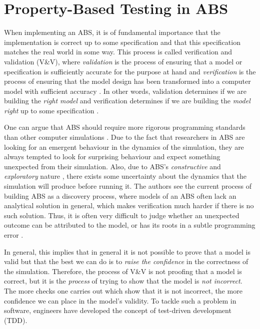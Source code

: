 \chapter{Property-Based Testing in ABS}
\label{ch:property}

When implementing an ABS, it is of fundamental importance that the implementation is correct up to some specification and that this specification matches the real world in some way. This process is called verification and validation (V\&V), where \textit{validation} is the process of ensuring that a model or specification is sufficiently accurate for the purpose at hand and \textit{verification} is the process of ensuring that the model design has been transformed into a computer model with sufficient accuracy \cite{robinson_simulation:_2014}. In other words, validation determines if we are building the \textit{right model} and verification determines if we are building the \textit{model right} up to some specification \cite{balci_verification_1998}.

One can argue that ABS should require more rigorous programming standards than other computer simulations \cite{polhill_ghost_2005}. Due to the fact that researchers in ABS are looking for an emergent behaviour in the dynamics of the simulation, they are always tempted to look for surprising behaviour and expect something unexpected from their simulation. 
Also, due to ABS's \textit{constructive} and \textit{exploratory} nature \cite{epstein_chapter_2006, epstein_generative_2012}, there exists some uncertainty about the dynamics that the simulation will produce before running it. The authors \cite{ormerod_validation_2006} see the current process of building ABS as a discovery process, where models of an ABS often lack an analytical solution in general, which makes verification much harder if there is no such solution. Thus, it is often very difficult to judge whether an unexpected outcome can be attributed to the model, or has its roots in a subtle programming error \cite{galan_errors_2009}.

In general, this implies that in general it is not possible to prove that a model is valid but that the best we can do is to \textit{raise the confidence} in the correctness of the simulation. Therefore, the process of V\&V is not proofing that a model is correct, but it is the \textit{process} of trying to show that the model is \textit{not incorrect}. The more checks one carries out which show that it is not incorrect, the more confidence we can place in the model's validity. To tackle such a problem in software, engineers have developed the concept of test-driven development (TDD).

